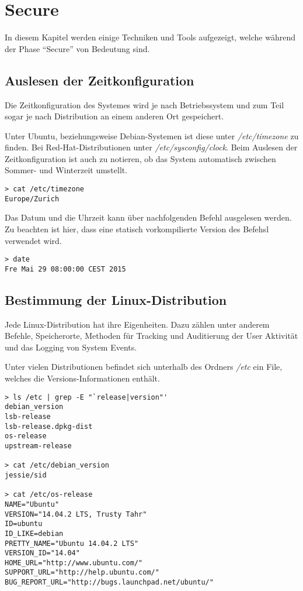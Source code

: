 \section{Secure}
In diesem Kapitel werden einige Techniken und Tools aufgezeigt, welche während der Phase "`Secure"' von Bedeutung sind. 


\subsection{Auslesen der Zeitkonfiguration}
Die Zeitkonfiguration des Systemes wird je nach Betriebssystem und zum Teil sogar je nach Distribution an einem anderen Ort gespeichert.

Unter Ubuntu, beziehungsweise Debian-Systemen ist diese unter \textit{/etc/timezone} zu finden. Bei Red-Hat-Distributionen unter \textit{/etc/sysconfig/clock}.
Beim Auslesen der Zeitkonfiguration ist auch zu notieren, ob das System automatisch zwischen Sommer- und Winterzeit umstellt.

\begin{lstlisting}
> cat /etc/timezone
Europe/Zurich
\end{lstlisting}

Das Datum und die Uhrzeit kann über nachfolgenden Befehl ausgelesen werden. Zu beachten ist hier, dass eine statisch vorkompilierte Version des Befehsl verwendet wird.
\begin{lstlisting}
> date
Fre Mai 29 08:00:00 CEST 2015
\end{lstlisting}



\subsection{Bestimmung der Linux-Distribution}
Jede Linux-Distribution hat ihre Eigenheiten. Dazu zählen unter anderem Befehle, Speicherorte, Methoden für Tracking und Auditierung der User Aktivität und das Logging von System Events.

Unter vielen Distributionen befindet sich unterhalb des Ordners \textit{/etc} ein File, welches die Versions-Informationen enthält.\\
\begin{lstlisting}
> ls /etc | grep -E "`release|version"'
debian_version
lsb-release
lsb-release.dpkg-dist
os-release
upstream-release

> cat /etc/debian_version
jessie/sid

> cat /etc/os-release
NAME="Ubuntu"
VERSION="14.04.2 LTS, Trusty Tahr"
ID=ubuntu
ID_LIKE=debian
PRETTY_NAME="Ubuntu 14.04.2 LTS"
VERSION_ID="14.04"
HOME_URL="http://www.ubuntu.com/"
SUPPORT_URL="http://help.ubuntu.com/"
BUG_REPORT_URL="http://bugs.launchpad.net/ubuntu/"
\end{lstlisting}

